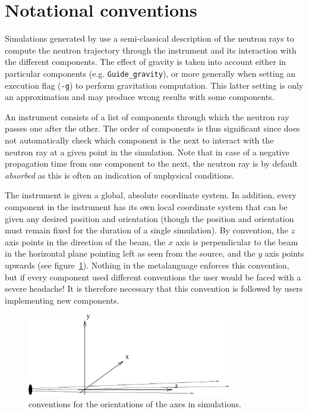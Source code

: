 \section{Notational conventions}

Simulations generated by \MCS use a semi-classical description of the neutron
rays to compute the neutron trajectory through the instrument and its
interaction with the different components. The effect of gravity is taken into
account either in particular components (e.g. \verb+Guide_gravity+), or more
generally when setting an execution flag (\verb+-g+) to perform gravitation
computation. This latter setting is only an approximation and may produce wrong
results with some components.

An instrument consists of a list of components through which the neutron
ray passes one after the other. The order of components is thus significant
since \MCS does not automatically check which component is the next to
interact with the neutron ray at a given point in the simulation. Note
that in case of a negative propagation time from one component to the
next, the neutron ray is by default \emph{absorbed} as this is often
an indication of unphysical conditions.

The instrument is given a global, absolute coordinate system. In
addition, every component in the instrument has its own local coordinate
system that can be given any desired position and orientation (though
the position and orientation must remain fixed for the duration of a
single simulation). 
By convention, the $z$ axis points in the direction of the beam, the $x$ axis
is perpendicular to the beam in the horizontal plane pointing left as seen
from the source, and the $y$ axis points upwards (see figure~\ref{f:axis}).
Nothing in the \MCS metalanguage enforces this convention, but if every component used
different conventions the user would be faced with a severe headache! It is
therefore necessary that this convention is followed by users implementing
new components.
\begin{figure}
  \begin{center}
    \includegraphics[width=0.8\textwidth]{figures/axis-conventions}
  \end{center}
\caption{conventions for the orientations of the axes in simulations.}
\label{f:axis}
\end{figure}

